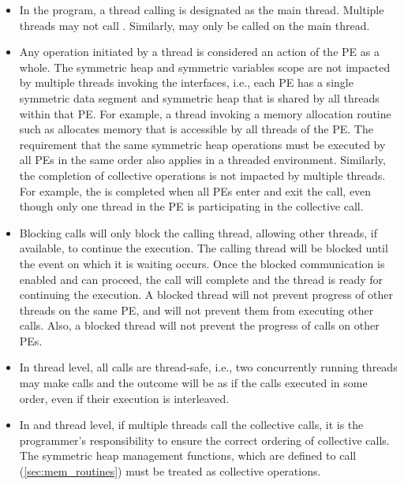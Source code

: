 \begin{itemize}
\item
In the \openshmem{} program, a thread calling  is designated as the main
thread. Multiple threads may not call . Similarly,
 may only be called on the main thread.

\item
Any \openshmem{} operation initiated by a thread is considered an action of the \ac{PE} as a whole.
The symmetric heap and symmetric variables scope
are not impacted by multiple threads invoking the
\openshmem{} interfaces, i.e., 
each \ac{PE} has a single symmetric data segment and symmetric heap that is shared by
all threads within that \ac{PE}.  For example, a thread invoking a memory allocation
routine such as  
allocates memory that is accessible by all threads of the \ac{PE}. 
The requirement that the same symmetric heap operations must
be executed by all \acp{PE} in the same order also applies in a threaded
environment. Similarly, the completion of collective operations is not impacted by multiple threads. 
For example, the  is completed when all \acp{PE} enter and
exit the  call, even though only one thread in the \ac{PE} is
participating in the collective call. 

\item Blocking \openshmem{} calls will only block the calling thread, allowing
other threads, if available, to continue the execution. The calling thread will be blocked until the
event on which it is waiting occurs. Once the blocked communication is enabled
and can proceed, the call will complete and the thread is ready for
continuing the execution. A blocked thread will not prevent progress of
other threads on the same \ac{PE}, and will not prevent them from
executing other \openshmem{} calls. Also, a blocked thread will not prevent the
progress of \openshmem{} calls on other \acp{PE}. 

\item In  thread level, all \openshmem{} calls are thread-safe, 
i.e., two concurrently running threads may make \openshmem{} calls and the outcome will be as if the calls executed in
some order, even if their execution is interleaved.


\item
In  and  thread level, 
if multiple threads call the collective calls, it is the programmer's responsibility to ensure the correct ordering of
collective calls.  The symmetric heap management functions, which are defined to call
(\ref{sec:mem_routines}) must be treated as collective operations.


\end{itemize} 
